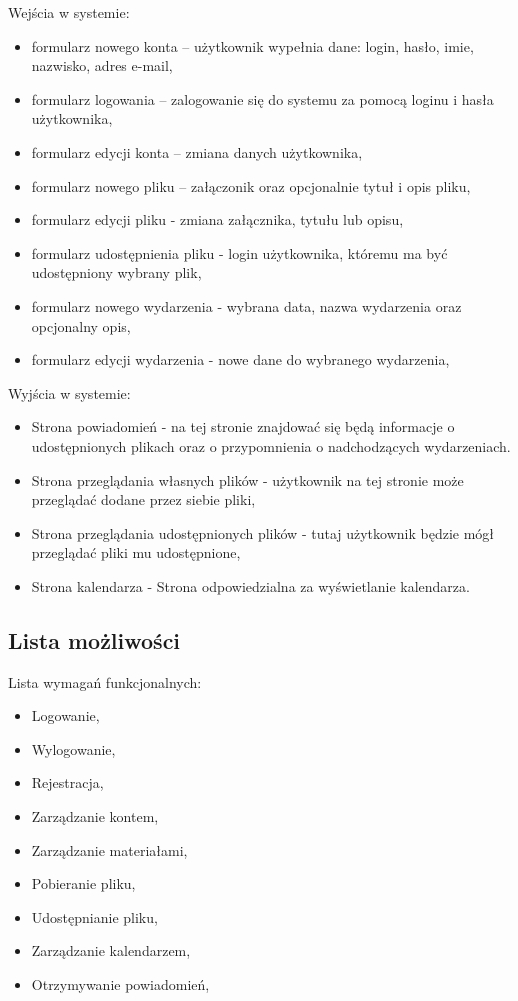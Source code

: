 Wejścia w systemie:
\begin{itemize}
	\item formularz nowego konta – użytkownik wypełnia dane: login, hasło, imie, nazwisko, adres e-mail,
	\item formularz logowania – zalogowanie się do systemu za pomocą loginu i hasła użytkownika,
	\item formularz edycji konta – zmiana danych użytkownika,
	\item formularz nowego pliku – załączonik oraz opcjonalnie tytuł i opis pliku,
	\item formularz edycji pliku - zmiana załącznika, tytułu lub opisu,
	\item formularz udostępnienia pliku - login użytkownika, któremu ma być udostępniony wybrany plik,
	\item formularz nowego wydarzenia - wybrana data, nazwa wydarzenia oraz opcjonalny opis,
	\item formularz edycji wydarzenia - nowe dane do wybranego wydarzenia,
\end{itemize}
Wyjścia w systemie:
\begin{itemize}
	\item Strona powiadomień - na tej stronie znajdować się będą informacje o udostępnionych plikach oraz o przypomnienia o nadchodzących wydarzeniach.
	\item Strona przeglądania własnych plików - użytkownik na tej stronie może przeglądać dodane przez siebie pliki,
	\item Strona przeglądania udostępnionych plików - tutaj użytkownik będzie mógł przeglądać pliki mu udostępnione,
	\item Strona kalendarza - Strona odpowiedzialna za wyświetlanie kalendarza.
\end{itemize}
\subsection{Lista możliwości}
\label{listaFun}
Lista wymagań funkcjonalnych:
\begin{itemize}
	\item Logowanie,
	\item Wylogowanie,
	\item Rejestracja,
	\item Zarządzanie kontem,
	\item Zarządzanie materiałami,
	\item Pobieranie pliku,
	\item Udostępnianie pliku,
	\item Zarządzanie kalendarzem,
	\item Otrzymywanie powiadomień,
\end{itemize}

